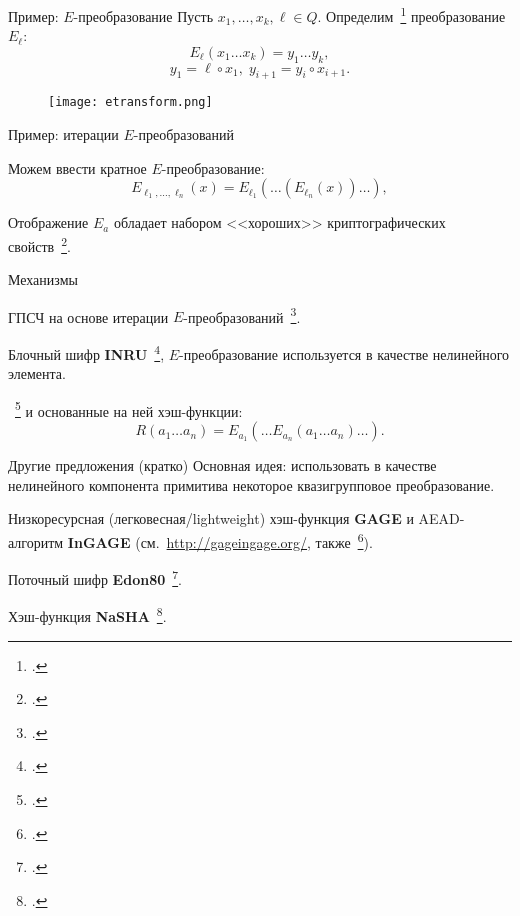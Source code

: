 \begin{frame}{Пример: $E$-преобразование}
    Пусть $x_1, \ldots, x_k, \ell \in Q$.
    Определим~\footcite{markovski2017quasigroup} преобразование $E_{\ell}$:
    \[
        E_{\ell}(x_1 \ldots x_k) = y_1 \ldots y_k,
    \]
    \[
        y_1 = \ell \circ x_1, \; y_{i+1} = y_i \circ x_{i+1}.
    \]
    \begin{figure}[h]
        \centering 
        \texttt{[image: etransform.png]}
    \end{figure}
\end{frame}


\begin{frame}{Пример: итерации $E$-преобразований}
    \begin{coloritemize}
        \item Можем ввести кратное $E$-преобразование:
        \[
            E_{\ell_1, \ldots, \ell_n}(x) = E_{\ell_1} \left( \ldots \left( E_{\ell_n} (x) \right) \ldots \right), 
        \]
        \item Отображение $E_{a}$ обладает набором <<хороших>> криптографических свойств~\footcite{markovski1999quasigroup, bakeva2011some, markovski2017quasigroup, yash13, yash22, yash22-2}.
    \end{coloritemize}
\end{frame}


\begin{frame}{Механизмы}
    \begin{coloritemize}
        \item ГПСЧ на основе итерации $E$-преобразований~\footcite{dimitrova2004quasigroup, markovski2005unbiased}.
        \item Блочный шифр \textbf{INRU}~\footcite{inru}, $E$-преобразование используется в качестве нелинейного элемента.
        \item  {}~\footcite{gligoroski2008edon, gligoroski2009family, EdonR, EdonRprime} и основанные на ней хэш-функции:
        \[
            R(a_1 \ldots a_n) = E_{a_1} \left( \ldots E_{a_n}(a_1 \ldots a_n) \ldots \right).
        \]
    \end{coloritemize}
\end{frame}


\begin{frame}{Другие предложения (кратко)}
    Основная идея: использовать в качестве нелинейного компонента примитива некоторое квазигрупповое преобразование.
    \begin{coloritemize}
        \item Низкоресурсная (легковесная/lightweight) хэш-функция \textbf{GAGE} и AEAD-алгоритм \textbf{InGAGE} (см.~\url{http://gageingage.org/}, также~\footcite{otte2019gage, gligoroski2019s}).
        \item Поточный шифр \textbf{Edon80}~\footcite{edon80}.
        \item Хэш-функция \textbf{NaSHA}~\footcite{mileva2009quasigroup}.
    \end{coloritemize}
\end{frame}


